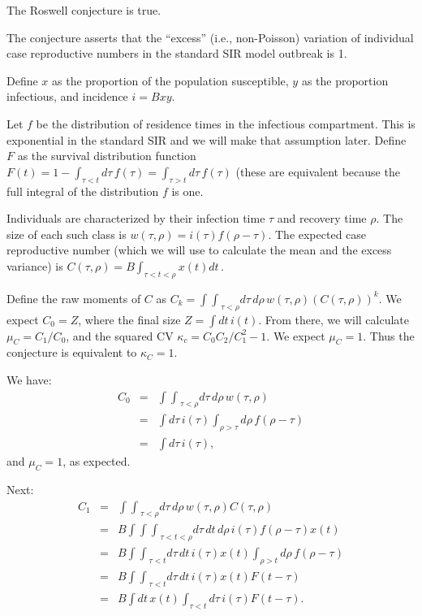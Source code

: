 \documentclass[12pt]{article}
\newcommand{\dt}{dt\,}
\newcommand{\dtau}{d\tau\,}
\newcommand{\drho}{d\rho\,}
\newcommand{\intint}{{\int\!\!\int}}
\newcommand{\intintint}{{\int\!\!\int\!\!\int}}
\newcommand{\eqlab}[1]{\label{eq:#1}}
\begin{document}
The Roswell conjecture is true.

The conjecture asserts that the “excess” (i.e., non-Poisson) variation of individual case reproductive numbers in the standard SIR model outbreak is 1.

Define $x$ as the proportion of the population susceptible, $y$ as the proportion infectious, and incidence $i = Bxy$.

Let $f$ be the distribution of residence times in the infectious compartment. This is exponential in the standard SIR and we will make that assumption later. Define $F$ as the survival distribution function 
$F(t) 
	= 1 -\int_{\tau<t} \dtau f(\tau)
	= \int_{\tau>t} \dtau f(\tau)
$ (these are equivalent because the full integral of the distribution $f$ is one.

Individuals are characterized by their infection time $\tau$ and recovery time $\rho$. The size of each such class is $w(\tau, \rho) = i(\tau) f(\rho-\tau)$. The expected case reproductive number (which we will use to calculate the mean and the excess variance) is $C(\tau, \rho) = B \int_{\tau<t<\rho} x(t) \dt$.

Define the raw moments of $C$ as $C_k = \intint_{\tau<\rho} \dtau\drho w(\tau, \rho) (C(\tau, \rho))^k$. 
We expect $C_0=Z$, where the final size $Z = \int\dt i(t)$. From there, we will calculate $\mu_C = C_1/C_0$, and the squared CV $\kappa_c = C_0C_2/C_1^2-1$. We expect $\mu_C=1$. Thus the conjecture is equivalent to $\kappa_C = 1$.

We have:
\begin{eqnarray}
	C_0
	&=& \intint_{\tau<\rho} \dtau\drho w(\tau, \rho) 
	\\ &=& \int \dtau i(\tau) \int_{\rho>\tau} \drho f(\rho-\tau)
	\\ &=& \int \dtau i(\tau), 
\end{eqnarray}
and $\mu_C=1$, as expected.

Next:
\begin{eqnarray}
	C_1
	&=& \intint_{\tau<\rho} \dtau\drho w(\tau, \rho) C(\tau, \rho)
	\\ &=& B \intintint_{\tau<t<\rho} \dtau\dt\drho 
		i(\tau) f(\rho-\tau) x(t)
	\\ &=& B \intint_{\tau<t} \dtau\dt i(\tau) x(t)
		\int_{\rho>t} \drho f(\rho-\tau) 
	\\ &=& B \intint_{\tau<t} \dtau\dt i(\tau) x(t) F(t-\tau)
	\\ &=& B \int \dt x(t) \int_{\tau<t}\dtau i(\tau) F(t-\tau).
	\eqlab{C1pre}
\end{eqnarray}
\end{document}
